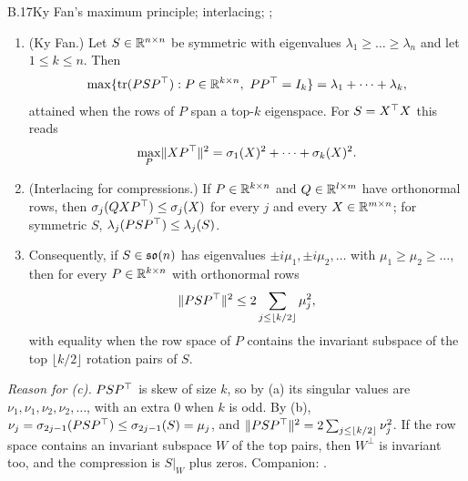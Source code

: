 \begin{auxresult}{B.17}{Ky Fan's maximum principle; interlacing}{\citep{xfan1949theorem}; \citep[Ch.~III]{xbhatia1997matrix};
\citep[Ch.~3]{xhorn1991topics}}
\begin{enumerate}[label=(\alph*)]
  \item (Ky Fan.) Let $S\in\mathbb{R}^{n\times n}$ be symmetric with eigenvalues $\lambda_1\ge\dots\ge\lambda_n$ and let
    $1\le k\le n$. Then
    \begin{equation*}
      \max\{\tr(PSP\T):P\in\R^{k\times n},\ PP\T=I_k\}=\lambda_1+\dots+\lambda_k ,
    \end{equation*}
    attained when the rows of $P$ span a top-$k$ eigenspace. For $S=X^{\top} X$ this reads
    \begin{equation*}
      \max_P\lVert XP^{\top}\rVert^2=\sigma_1(X)^2+\dots+\sigma_k(X)^2 .
    \end{equation*}
  \item (Interlacing for compressions.) If $P\in\mathbb{R}^{k\times n}$ and $Q\in\mathbb{R}^{l\times m}$ have orthonormal rows, then
    $\sigma_j(QXP^{\top})\le\sigma_j(X)$ for every $j$ and every $X\in\mathbb{R}^{m\times n}$; for symmetric $S$,
    $\lambda_j(PSP^{\top})\le\lambda_j(S)$.
  \item Consequently, if $S\in\mathfrak{so}(n)$ has eigenvalues $\pm i\mu_1,\pm i\mu_2,\dots$ with $\mu_1\ge\mu_2\ge\dots$, then
    for every $P\in\mathbb{R}^{k\times n}$ with orthonormal rows
    \begin{equation*}
      \lVert PSP^{\top}\rVert^2\le2\sum_{j\le\lfloor k/2\rfloor}\mu_j^2 ,
    \end{equation*}
    with equality when the row space of $P$ contains the invariant subspace of the top $\lfloor k/2\rfloor$ rotation
    pairs of $S$.
\end{enumerate}
\end{auxresult}
\noindent\emph{Reason for (c).} $PSP^{\top}$ is skew of size $k$, so by (a) its singular values are
$\nu_1,\nu_1,\nu_2,\nu_2,\dots$, with an extra $0$ when $k$ is odd. By (b), $\nu_j=\sigma_{2j-1}(PSP^{\top})\le
\sigma_{2j-1}(S)=\mu_j$, and $\lVert PSP^{\top}\rVert^2=2\sum_{j\le\lfloor k/2\rfloor}\nu_j^2$. If the row space contains an
invariant subspace $W$ of the top pairs, then $W^\perp$ is invariant too, and the compression is $S|_W$ plus zeros.
Companion: .

